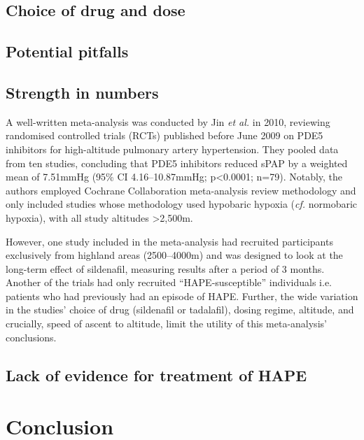 \documentclass[10pt,a4paper]{article}
\begin{document}
\subsection*{Choice of drug and dose}

\subsection*{Potential pitfalls}

\subsection*{Strength in numbers}

A well-written meta-analysis was conducted by Jin \emph{et al.} in 2010, reviewing randomised controlled trials (RCTs) published before June 2009 on PDE5 inhibitors for high-altitude pulmonary artery hypertension.\cite{Jin:2010fc} They pooled data from ten studies, concluding that PDE5 inhibitors reduced sPAP by a weighted mean of 7.51mmHg (95\% CI 4.16--10.87mmHg; p<0.0001; n=79). Notably, the authors employed Cochrane Collaboration meta-analysis review methodology and only included studies whose methodology used hypobaric hypoxia (\emph{cf.} normobaric hypoxia), with all study altitudes >2,500m.

However, one study included in the meta-analysis had recruited participants exclusively from highland areas (2500--4000m) and was designed to look at the long-term effect of sildenafil, measuring results after a period of 3 months.\cite{Aldashev:2005fr} Another of the trials had only recruited ``HAPE-susceptible'' individuals i.e. patients who had previously had an episode of HAPE.\cite{Maggiorini:2006kz} Further, the wide variation in the studies' choice of drug (sildenafil or tadalafil), dosing regime, altitude, and crucially, speed of ascent to altitude, limit the utility of this meta-analysis' conclusions.

\subsection*{Lack of evidence for treatment of HAPE}

\section*{Conclusion}





\end{document}
